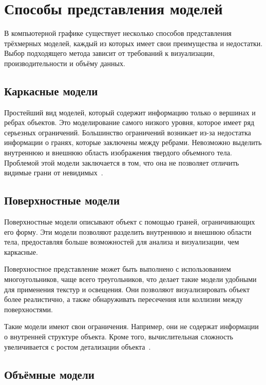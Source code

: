 \clearpage

\section{Способы представления моделей}

В компьютерной графике существует несколько способов представления трёхмерных моделей,
каждый из которых имеет свои преимущества и недостатки. Выбор подходящего метода зависит от требований к визуализации,
производительности и объёму данных.

\subsection{Каркасные модели}

Простейший вид моделей, который содержит информацию только о вершинах и ребрах объектов.
Это моделирование самого низкого уровня, которое имеет ряд серьезных ограничений.
Большинство ограничений возникает из-за недостатка информации
о гранях, которые заключены между ребрами. Невозможно выделить
внутреннюю и внешнюю область изображения твердого объемного тела.
Проблемой этой модели заключается в том, что она
не позволяет отличить видимые грани от невидимых~\cite{rodz}.

\subsection{Поверхностные модели}

Поверхностные модели описывают объект с помощью граней, ограничивающих его форму.
Эти модели позволяют разделить внутреннюю и внешнюю области тела, предоставляя больше возможностей для анализа
и визуализации, чем каркасные.

Поверхностное представление может быть выполнено с использованием многоугольников, чаще всего треугольников,
что делает такие модели удобными для применения текстур и освещения.
Они позволяют визуализировать объект более реалистично, а также обнаруживать пересечения или коллизии между поверхностями.

Такие модели имеют свои ограничения.
Например, они не содержат информации о внутренней структуре объекта.
Кроме того, вычислительная сложность увеличивается с ростом детализации объекта~\cite{rodz}.

\subsection{Объёмные модели}


